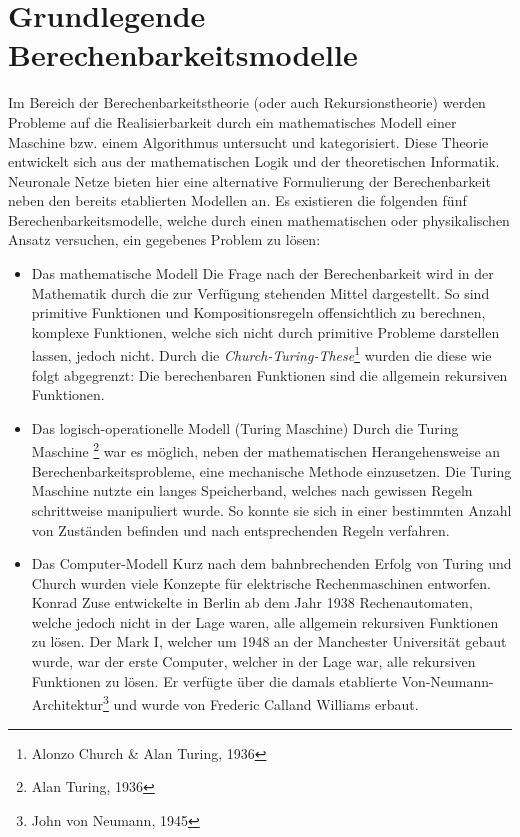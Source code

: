 \section{Grundlegende Berechenbarkeitsmodelle}
\label{sec:neuro_models}
	Im Bereich der Berechenbarkeitstheorie (oder auch Rekursionstheorie) werden Probleme auf die Realisierbarkeit durch ein mathematisches Modell einer Maschine bzw. einem Algorithmus untersucht und kategorisiert. Diese Theorie entwickelt sich aus der mathematischen Logik und der theoretischen Informatik. Neuronale Netze bieten hier eine alternative Formulierung der Berechenbarkeit neben den bereits etablierten Modellen an. Es existieren die folgenden fünf Berechenbarkeitsmodelle, welche durch einen mathematischen oder physikalischen Ansatz versuchen, ein gegebenes Problem zu lösen:
	\begin{itemize}
		\item Das mathematische Modell
			\subitem Die Frage nach der Berechenbarkeit wird in der Mathematik durch die zur Verfügung stehenden Mittel dargestellt. So sind primitive Funktionen und Kompositionsregeln offensichtlich zu berechnen, komplexe Funktionen, welche sich nicht durch primitive Probleme darstellen lassen, jedoch nicht. Durch die \textit{Church-Turing-These}\footnote{Alonzo Church \& Alan Turing, 1936} wurden die diese wie folgt abgegrenzt: \glqq Die berechenbaren Funktionen sind die allgemein rekursiven Funktionen.\grqq
			\newpage
		\item Das logisch-operationelle Modell (Turing Maschine)
			\subitem Durch die Turing Maschine \footnote{Alan Turing, 1936} war es möglich, neben der mathematischen Herangehensweise an Berechenbarkeitsprobleme, eine mechanische Methode einzusetzen. Die Turing Maschine nutzte ein langes Speicherband, welches nach gewissen Regeln schrittweise manipuliert wurde. So konnte sie sich in einer bestimmten Anzahl von Zuständen befinden und nach entsprechenden Regeln verfahren.
		\item Das Computer-Modell
			\subitem Kurz nach dem bahnbrechenden Erfolg von Turing und Church wurden viele Konzepte für elektrische Rechenmaschinen entworfen. Konrad Zuse entwickelte in Berlin ab dem Jahr 1938 Rechenautomaten, welche jedoch nicht in der Lage waren, alle allgemein rekursiven Funktionen zu lösen. Der Mark I, welcher um 1948 an der Manchester Universität gebaut wurde, war der erste Computer, welcher in der Lage war, alle rekursiven Funktionen zu lösen. Er verfügte über die damals etablierte Von-Neumann-Architektur\footnote{John von Neumann, 1945} und wurde von Frederic Calland Williams erbaut.

\end{itemize}
